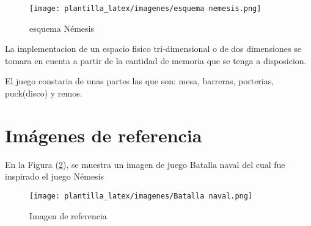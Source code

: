 \documentclass{article}
\begin{document}
\begin{figure}[h]
\texttt{[image: plantilla\_latex/imagenes/esquema nemesis.png]}
\centering
\caption{esquema Némesis}
\label{fig:cpplogo}
\end{figure}
La implementacion de un espacio fisico tri-dimensional o de dos dimensiones se tomara en cuenta a partir de la cantidad de memoria que se tenga a disposicion.


El juego constaria de unas partes las que son: mesa, barreras, porterias, puck(disco) y remos.

\section{ Imágenes de referencia} \label{imagenes}

En la Figura (\ref{fig:Batalla}), se muestra un imagen de juego Batalla naval del cual fue inspirado el juego Némesis

\label{imagenes}
\begin{figure}[h]
\texttt{[image: plantilla\_latex/imagenes/Batalla naval.png]}
\centering
\caption{Imagen de referencia}
\label{fig:Batalla}
\end{figure}
\end{document}
